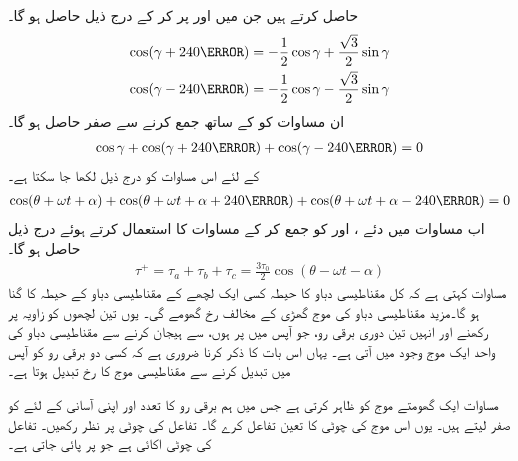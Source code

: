 حاصل کرتے ہیں جن میں   اور  پر کر کے درج ذیل حاصل ہو گا۔
\begin{align*}
\cos (\gamma+240\degree)&=-\frac{1}{2}\cos \gamma +\frac{\sqrt{3}}{2}\sin \gamma\\
\cos (\gamma-240\degree)&=-\frac{1}{2}\cos \gamma -\frac{\sqrt{3}}{2}\sin \gamma
\end{align*}
ان مساوات کو    کے ساتھ جمع کرنے سے  صفر حاصل ہو گا۔
\begin{align*}
\cos \gamma +\cos (\gamma+240\degree)+\cos (\gamma-240\degree)=0
\end{align*}
 کے لئے اس مساوات کو درج ذیل لکھا جا سکتا ہے۔
\begin{align}\label{مساوات_تبادلہ_تین_سمتیات_جمع_صفر}
\cos (\theta +\omega t +\alpha) +\cos (\theta +\omega t +\alpha+240\degree)+\cos (\theta+\omega t +\alpha-240\degree)=0
\end{align}
اب مساوات   میں دئے   ،  اور   کو جمع کر کے مساوات   کا استعمال کرتے ہوئے درج ذیل حاصل ہو گا۔
\begin{align}\label{مساوات_تبادلہ_گھومتا_موج}
\tau^+=\tau_a+\tau_b+\tau_c=\frac{3 \tau_0}{2} \cos (\theta -\omega t -\alpha)
\end{align}
مساوات  کہتی ہے کہ کل مقناطیسی دباو کا حیطہ کسی ایک لچھے کے مقناطیسی دباو کے حیطہ کا  گنا ہو گا۔مزید مقناطیسی دباو کی موج گھڑی کے مخالف رخ گھومے گی۔ یوں  تین لچھوں کو   زاویہ پر رکھنے اور انہیں تین دوری برقی رو، جو آپس میں  پر ہوں،  سے  ہیجان کرنے سے  مقناطیسی دباو کی واحد ایک موج وجود میں آتی ہے۔ یہاں اس بات کا ذکر کرنا ضروری ہے کہ  کسی دو برقی رو کو آپس میں تبدیل کرنے سے مقناطیسی موج کا رخ تبدیل ہوتا ہے۔  

مساوات  ایک گھومتے موج کو ظاہر کرتی ہے جس میں ہم برقی رو کا تعدد   اور اپنی آسانی کے لئے   کو صفر لیتے ہیں۔  یوں اس موج کی چوٹی کا تعین تفاعل  کرے گا۔  تفاعل  کی چوٹی پر نظر رکھیں۔ تفاعل  کی چوٹی اکائی ہے جو  پر پائی جاتی ہے۔

